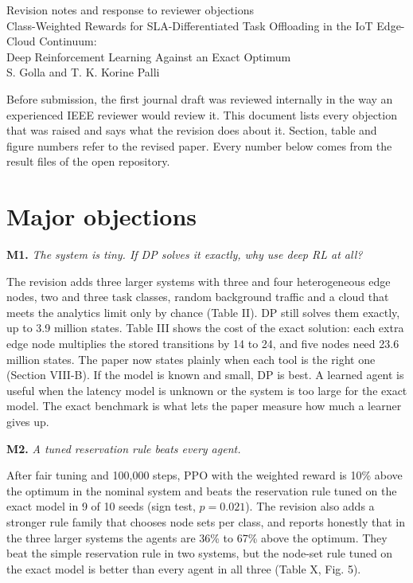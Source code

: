 \documentclass[11pt]{article}
\newcommand{\obj}[2]{\par\medskip\textbf{#1.} \emph{#2}\par}
\begin{document}
\begin{center}
{\Large Revision notes and response to reviewer objections}\\[4pt]
Class-Weighted Rewards for SLA-Differentiated Task Offloading in the IoT Edge-Cloud Continuum:\\
Deep Reinforcement Learning Against an Exact Optimum\\[4pt]
S. Golla and T. K. Korine Palli
\end{center}

Before submission, the first journal draft was reviewed internally in the way an experienced IEEE reviewer would review it. This document lists every objection that was raised and says what the revision does about it. Section, table and figure numbers refer to the revised paper. Every number below comes from the result files of the open repository.

\section*{Major objections}

\obj{M1}{The system is tiny. If DP solves it exactly, why use deep RL at all?}
The revision adds three larger systems with three and four heterogeneous edge nodes, two and three task classes, random background traffic and a cloud that meets the analytics limit only by chance (Table II). DP still solves them exactly, up to 3.9 million states. Table III shows the cost of the exact solution: each extra edge node multiplies the stored transitions by 14 to 24, and five nodes need 23.6 million states. The paper now states plainly when each tool is the right one (Section VIII-B). If the model is known and small, DP is best. A learned agent is useful when the latency model is unknown or the system is too large for the exact model. The exact benchmark is what lets the paper measure how much a learner gives up.

\obj{M2}{A tuned reservation rule beats every agent.}
After fair tuning and 100,000 steps, PPO with the weighted reward is 10\% above the optimum in the nominal system and beats the reservation rule tuned on the exact model in 9 of 10 seeds (sign test, $p=0.021$). The revision also adds a stronger rule family that chooses node sets per class, and reports honestly that in the three larger systems the agents are 36\% to 67\% above the optimum. They beat the simple reservation rule in two systems, but the node-set rule tuned on the exact model is better than every agent in all three (Table X, Fig. 5).
\end{document}
